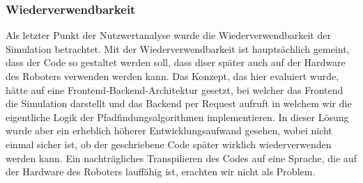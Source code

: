 \documentclass[main.tex]{subfiles} %
\begin{document}
\subsubsection*{Wiederverwendbarkeit}
Als letzter Punkt der Nutzwertanalyse wurde die Wiederverwendbarkeit der
Simulation betrachtet. Mit der Wiederverwendbarkeit ist hauptsächlich gemeint,
dass der Code so gestaltet werden soll, dass diser später auch auf der Hardware
des Roboters verwenden werden kann. Das Konzept, das hier evaluiert wurde,
hätte auf eine Frontend-Backend-Architektur gesetzt, bei welcher das Frontend
die Simulation darstellt und das Backend per Request aufruft in welchem wir die
eigentliche Logik der Pfadfindungsalgorithmen implementieren. In dieser Lösung
wurde aber ein erheblich höherer Entwicklungsaufwand gesehen, wobei nicht
einmal sicher ist, ob der geschriebene Code später wirklich wiederverwenden
werden kann. Ein nachträgliches Transpilieren des Codes auf eine Sprache, die
auf der Hardware des Roboters lauffähig ist, erachten wir nicht als Problem.
\end{document}
